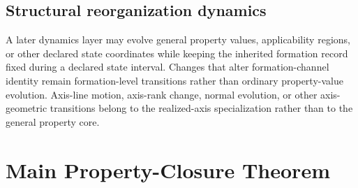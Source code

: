 \documentclass[11pt]{article}
\theoremstyle{definition}
\theoremstyle{remark}
\begin{document}
\subsection{Structural reorganization dynamics}

A later dynamics layer may evolve general property values, applicability regions, or other declared state coordinates while keeping the inherited formation record fixed during a declared state interval.
Changes that alter formation-channel identity remain formation-level transitions rather than ordinary property-value evolution.
Axis-line motion, axis-rank change, normal evolution, or other axis-geometric transitions belong to the realized-axis specialization rather than to the general property core.

\section{Main Property-Closure Theorem}
\label{sec:main-theorem}
\end{document}
